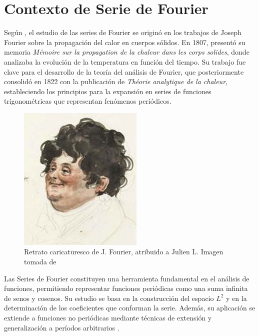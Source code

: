 \chapter[Contexto de Serie de Fourier
]{Contexto de Serie de Fourier}
{
\parindent0pt

Según \cite{Arenas2014}, el estudio de las series de Fourier se originó en los trabajos de Joseph Fourier sobre la propagación del calor en cuerpos sólidos. En 1807, presentó su memoria \textit{Mémoire sur la propagation de la chaleur dans les corps solides}, donde analizaba la evolución de la temperatura en función del tiempo. Su trabajo fue clave para el desarrollo de la teoría del análisis de Fourier, que posteriormente consolidó en 1822 con la publicación de \textit{Théorie analytique de la chaleur}, estableciendo los principios para la expansión en series de funciones trigonométricas que representan fenómenos periódicos.
\vspace{10pt}

\begin{figure}[H]
    \centering
    \includegraphics[height=0.15\textheight]{Figures/retrato.png}
    \caption[Retrato caricaturesco de J. Fourier, atribuido a Julien Leopold Boilly]{Retrato caricaturesco de J. Fourier, atribuido a Julien L. Imagen tomada de  \cite{Arenas2014}}
    \label{fig:retrato}
\end{figure}

Las Series de Fourier constituyen una herramienta fundamental en el análisis de funciones, permitiendo representar funciones periódicas como una suma infinita de senos y cosenos. Su estudio se basa en la construcción del espacio \(L^2\) y en la determinación de los coeficientes que conforman la serie. Además, su aplicación se extiende a funciones no periódicas mediante técnicas de extensión y generalización a períodos arbitrarios \citep{DiagoNanez2023}.

}
